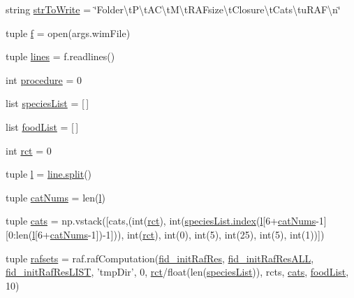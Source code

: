 \begin{DoxyCompactItemize}
\item 
string \hyperlink{a00100_a34b3667c3c217a35a0e9b71458d2b233}{str\-To\-Write} = \char`\"{}Folder\textbackslash{}t\-P\textbackslash{}t\-A\-C\textbackslash{}t\-M\textbackslash{}t\-R\-A\-Fsize\textbackslash{}t\-Closure\textbackslash{}t\-Cats\textbackslash{}tu\-R\-A\-F\textbackslash{}n\char`\"{}
\item 
tuple \hyperlink{a00100_ab599c65fad60b9c6ccc220002ce8f89c}{f} = open(args.\-wim\-File)
\item 
tuple \hyperlink{a00100_a2a83f40b2aa2cbcbd487195fef9af340}{lines} = f.\-readlines()
\item 
int \hyperlink{a00100_ac84174dad0b933ca88ebdb79cf3497ec}{procedure} = 0
\item 
list \hyperlink{a00100_aff8baae5d4cd1678204477dd5e620775}{species\-List} = \mbox{[}$\,$\mbox{]}
\item 
list \hyperlink{a00100_a878da371fd02e9515fe7305e0a57be09}{food\-List} = \mbox{[}$\,$\mbox{]}
\item 
int \hyperlink{a00100_a61159eb5aec77b97808ce3fb742d8f6d}{rct} = 0
\item 
tuple \hyperlink{a00100_a0437cd4d2a377ca0e34ab59f4bfd833f}{l} = \hyperlink{a00076_a4d1aa74fac80ae0275c056575fdb6626}{line.\-split}()
\item 
tuple \hyperlink{a00100_a0d474343423a1a87a760dd91411f96b4}{cat\-Nums} = len(\hyperlink{a00100_a0437cd4d2a377ca0e34ab59f4bfd833f}{l})
\item 
tuple \hyperlink{a00100_aea4d714ca7ceaba151380b3aed7c34d8}{cats} = np.\-vstack(\mbox{[}cats,(int(\hyperlink{a00100_a61159eb5aec77b97808ce3fb742d8f6d}{rct}), int(\hyperlink{a00060_a0cd6a44ffb07342cbc7e5ac33bfc9495}{species\-List.\-index}(\hyperlink{a00100_a0437cd4d2a377ca0e34ab59f4bfd833f}{l}\mbox{[}6+\hyperlink{a00100_a0d474343423a1a87a760dd91411f96b4}{cat\-Nums}-\/1\mbox{]}\mbox{[}0\-:len(\hyperlink{a00100_a0437cd4d2a377ca0e34ab59f4bfd833f}{l}\mbox{[}6+\hyperlink{a00100_a0d474343423a1a87a760dd91411f96b4}{cat\-Nums}-\/1\mbox{]})-\/1\mbox{]})), int(\hyperlink{a00100_a61159eb5aec77b97808ce3fb742d8f6d}{rct}), int(0), int(5), int(25), int(5), int(1))\mbox{]})
\item 
tuple \hyperlink{a00100_a36370edf2a6a4e19f0a99413aac43096}{rafsets} = raf.\-raf\-Computation(\hyperlink{a00100_a2f9cfe05abfed3ab6326d0cb094c7c80}{fid\-\_\-init\-Raf\-Res}, \hyperlink{a00100_add1c3bb75f1d98889c27099fc14fc6a8}{fid\-\_\-init\-Raf\-Res\-A\-L\-L}, \hyperlink{a00100_a7af2668de12720f3c7925527002d81b0}{fid\-\_\-init\-Raf\-Res\-L\-I\-S\-T}, 'tmp\-Dir', 0, \hyperlink{a00100_a61159eb5aec77b97808ce3fb742d8f6d}{rct}/float(len(\hyperlink{a00100_aff8baae5d4cd1678204477dd5e620775}{species\-List})), rcts, \hyperlink{a00100_aea4d714ca7ceaba151380b3aed7c34d8}{cats}, \hyperlink{a00100_a878da371fd02e9515fe7305e0a57be09}{food\-List}, 10)
\end{DoxyCompactItemize}


